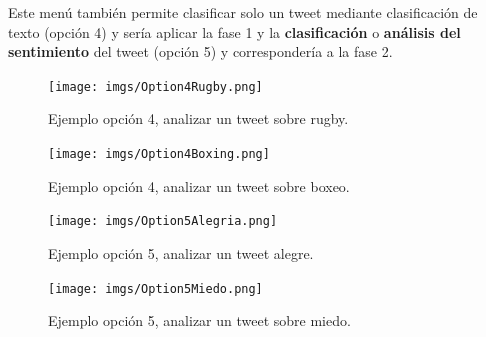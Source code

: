 \documentclass[../all.tex]{subfiles}
\begin{document}
	Este menú también permite clasificar solo un tweet mediante clasificación de texto (opción 4) y sería aplicar la fase 1 y la \textbf{clasificación} o \textbf{análisis del sentimiento} del tweet (opción 5) y correspondería a la fase 2.
	\begin{figure}[H]
		\centering
		\texttt{[image: imgs/Option4Rugby.png]}
		\caption{Ejemplo opción 4, analizar un tweet sobre rugby.}
	\end{figure}
	\begin{figure}[H]
		\centering
		\texttt{[image: imgs/Option4Boxing.png]}
		\caption{Ejemplo opción 4, analizar un tweet sobre boxeo.}
	\end{figure}
	\begin{figure}[H]
		\centering
		\texttt{[image: imgs/Option5Alegria.png]}
		\caption{Ejemplo opción 5, analizar un tweet alegre.}
	\end{figure}
	\begin{figure}[H]
		\centering
		\texttt{[image: imgs/Option5Miedo.png]}
		\caption{Ejemplo opción 5, analizar un tweet sobre miedo.}
	\end{figure}










\end{document}
